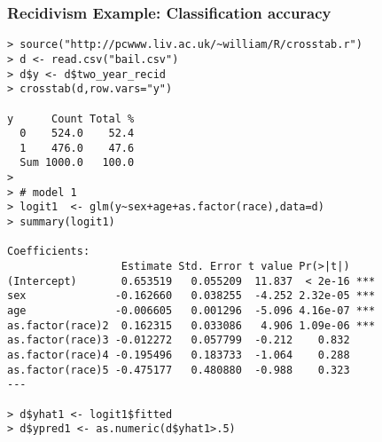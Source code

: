 \documentclass[xcolor=dvipsnames]{beamer}
\begin{document}


\begin{frame}[fragile]
\frametitle{Recidivism Example: Classification accuracy}

\begin{Verbatim}[fontsize=\tiny, frame=single, label=R Code]
> source("http://pcwww.liv.ac.uk/~william/R/crosstab.r") 
> d <- read.csv("bail.csv")
> d$y <- d$two_year_recid
> crosstab(d,row.vars="y")
     
y      Count Total %
  0    524.0    52.4
  1    476.0    47.6
  Sum 1000.0   100.0
> 
> # model 1 
> logit1  <- glm(y~sex+age+as.factor(race),data=d)
> summary(logit1)

Coefficients:
                  Estimate Std. Error t value Pr(>|t|)    
(Intercept)       0.653519   0.055209  11.837  < 2e-16 ***
sex              -0.162660   0.038255  -4.252 2.32e-05 ***
age              -0.006605   0.001296  -5.096 4.16e-07 ***
as.factor(race)2  0.162315   0.033086   4.906 1.09e-06 ***
as.factor(race)3 -0.012272   0.057799  -0.212    0.832    
as.factor(race)4 -0.195496   0.183733  -1.064    0.288    
as.factor(race)5 -0.475177   0.480880  -0.988    0.323    
---

> d$yhat1 <- logit1$fitted
> d$ypred1 <- as.numeric(d$yhat1>.5)
\end{Verbatim}
\end{frame}
\end{document}
